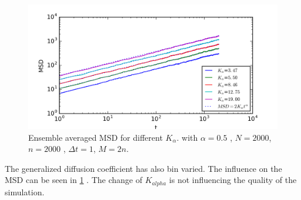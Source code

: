 \documentclass[
  a4paper,BCOR10mm,oneside,
  bibtotoc,idxtotoc,
  headsepline,footsepline,%
  fleqn,openbib
]{scrbook}
\begin{document}
\begin{figure}[h!]
\centering
\includegraphics[width=\textwidth]{./data/K_alpha_change.png}
\caption{Ensemble averaged MSD for different $K_\alpha$. with $\alpha=0.5$ , $N=2000$, $n=2000$ , $\Delta t = 1$, $M=2n$.}
\label{kalphachange}
\end{figure}
\noindent The generalized diffusion coefficient has also bin varied. The influence on the MSD can be seen in \cref{kalphachange} . The change of $K_{alpha}$ is not influencing the quality of the simulation.
\end{document}
